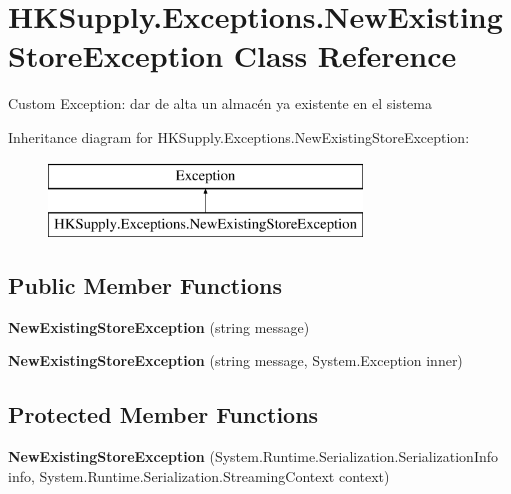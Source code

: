 \hypertarget{class_h_k_supply_1_1_exceptions_1_1_new_existing_store_exception}{}\section{H\+K\+Supply.\+Exceptions.\+New\+Existing\+Store\+Exception Class Reference}
\label{class_h_k_supply_1_1_exceptions_1_1_new_existing_store_exception}


Custom Exception\+: dar de alta un almacén ya existente en el sistema  


Inheritance diagram for H\+K\+Supply.\+Exceptions.\+New\+Existing\+Store\+Exception\+:\begin{figure}[H]
\begin{center}
\leavevmode
\includegraphics[height=2.000000cm]{class_h_k_supply_1_1_exceptions_1_1_new_existing_store_exception}
\end{center}
\end{figure}
\subsection*{Public Member Functions}
\begin{DoxyCompactItemize}
\item 
\mbox{\label{class_h_k_supply_1_1_exceptions_1_1_new_existing_store_exception_a9f726cdee4a92f54c0255145a96b59b3}} 
{\bfseries New\+Existing\+Store\+Exception} (string message)
\item 
\mbox{\label{class_h_k_supply_1_1_exceptions_1_1_new_existing_store_exception_a990262409d3923f1548098786d837bdc}} 
{\bfseries New\+Existing\+Store\+Exception} (string message, System.\+Exception inner)
\end{DoxyCompactItemize}
\subsection*{Protected Member Functions}
\begin{DoxyCompactItemize}
\item 
\mbox{\label{class_h_k_supply_1_1_exceptions_1_1_new_existing_store_exception_ab6a835ccea46086bd723b6700d90745d}} 
{\bfseries New\+Existing\+Store\+Exception} (System.\+Runtime.\+Serialization.\+Serialization\+Info info, System.\+Runtime.\+Serialization.\+Streaming\+Context context)
\end{DoxyCompactItemize}


